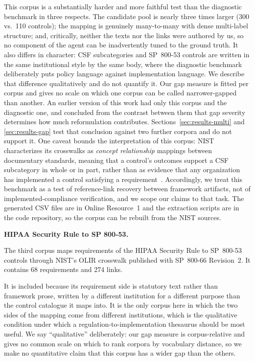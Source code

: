 \documentclass[smallextended,natbib]{svjour3}
\begin{document}
This corpus is a substantially harder and more faithful test than the diagnostic benchmark in three respects.
The candidate pool is nearly three times larger (300 vs.\ 110 controls); the mapping is genuinely many-to-many with dense multi-label structure; and, critically, neither the texts nor the links were authored by us, so no component of the agent can be inadvertently tuned to the ground truth.
It also differs in character: CSF subcategories and SP~800-53 controls are written in the same institutional style by the same body, where the diagnostic benchmark deliberately puts policy language against implementation language. We describe that difference qualitatively and do not quantify it. Our gap measure is fitted per corpus and gives no scale on which one corpus can be called narrower-gapped than another.
An earlier version of this work had only this corpus and the diagnostic one, and concluded from the contrast between them that gap severity determines how much reformulation contributes. Sections~\ref{sec:results-multi} and \ref{sec:results-gap} test that conclusion against two further corpora and do not support it.
One caveat bounds the interpretation of this corpus: NIST characterizes its crosswalks as \emph{concept relationship} mappings between documentary standards, meaning that a control's outcomes support a CSF subcategory in whole or in part, rather than as evidence that any organization has implemented a control satisfying a requirement~\citep{NISTIR8477}.
Accordingly, we treat this benchmark as a test of reference-link recovery between framework artifacts, not of implemented-compliance verification, and we scope our claims to that task.
The generated CSV files are in Online Resource~1 and the extraction scripts are in the code repository, so the corpus can be rebuilt from the NIST sources.

\noindent\textbf{HIPAA Security Rule to SP 800-53.}
\label{sec:dataset-hipaa}

The third corpus maps requirements of the HIPAA Security Rule to SP~800-53 controls through NIST's OLIR crosswalk published with SP~800-66 Revision~2. It contains 68 requirements and 274 links.

It is included because its requirement side is statutory text rather than framework prose, written by a different institution for a different purpose than the control catalogue it maps into. It is the only corpus here in which the two sides of the mapping come from different institutions, which is the qualitative condition under which a regulation-to-implementation thesaurus should be most useful. We say ``qualitative'' deliberately: our gap measure is corpus-relative and gives no common scale on which to rank corpora by vocabulary distance, so we make no quantitative claim that this corpus has a wider gap than the others.
\end{document}
